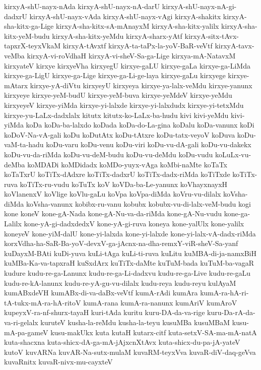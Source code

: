 {kirxyA-shU-nayx-nAda
kirxyA-shU-nayx-nA-darU
kirxyA-shU-nayx-nA-gi-dadxrU
kirxyA-shU-nayx-vAda
kirxyA-shU-nayx-vAgi
kirxyA-shakitx
kirxyA-sha-kitx-ga-Lige
kirxyA-sha-kitx-sA-mAnayxM
kirxyA-sha-kitx-yalilx
kirxyA-sha-kitx-yeM-budu
kirxyA-sha-kitx-yeMdu
kirxyA-sharx-yAtf
kirxyA-sitx-tAvx-tapxrX-teyxVkaM
kirxyA-tAvxtf
kirxyA-ta-taPx-la-yoV-BaR-veVtf
kirxyA-tavx-veMba
kirxyA-vi-roVdhaH
kirxyA-vi-sheV-Sa-ga-Lige
kirxya-mA-NatavxM
kirxyateV
kirxye
kirxyeVha
kirxyegU
kirxye-gaLU
kirxye-gaLa
kirxye-ga-LiMda
kirxye-ga-LigU
kirxye-ga-Lige
kirxye-ga-Li-ge-laya
kirxye-gaLu
kirxyege
kirxye-mAtarx
kirxye-yA-diVtu
kirxyeyU
kirxyeya
kirxye-ya-lalx-veMdu
kirxye-yanunx
kirxyeye
kirxye-yeM-budU
kirxye-yeM-buva
kirxye-yeMdeV
kirxye-yeMdu
kirxyeyeV
kirxye-yiMda
kirxye-yi-lalxde
kirxye-yi-lalxdudx
kirxye-yi-tetxMdu
kirxye-yu-LaLx-dadxlalx
kitutx
kitutx-ko-LaLx-ba-hudu
kivi
kivi-yeMdu
kivi-yiMda
koDa
koDa-ba-lalxdo
koDada
koDa-do-La-gina
koDalu
koDa-vanunx
koDi
koDoV-Na-vA-gali
koDu
koDutAtx
koDu-tAtxre
koDu-tatx-veyoV
koDuva
koDu-vaM-ta-hadu
koDu-varu
koDu-venu
koDu-viri
koDu-vu-dA-gali
koDu-vu-dakekx
koDu-vu-da-riMda
koDu-vu-deM-budu
koDu-vu-deMdu
koDu-vudu
koLuLx-vu-deMba
koMDADi
koMDidadx
koMDo-yuyx-vAga
koMbi-naMte
koTaTx
koTaTxrU
koTiTx-dAdxre
koTiTx-dadxrU
koTiTx-dadx-riMda
koTiTxde
koTiTx-ruva
koTiTx-ru-vudu
koTuTx
koV
koVDa-ba-Le-yanunx
koVhayxnayxH
koVlanenxV
koVlige
koVlu-gaLu
koVpa
koVpa-diMda
koVru-vu-dilalx
koVsha-diMda
koVsha-vanunx
kobibx-ru-vanu
kobubx
kobubx-vu-di-lalx-veM-budu
kogi
kone
koneV
kone-gA-Nada
kone-gA-Nu-va-da-riMda
kone-gA-Nu-vudu
kone-ga-Lalilx
kone-yA-gi-dadxdedxV
kone-yA-gi-ruva
koneya
kone-yalUlx
kone-yalilx
koneyeV
kone-yiM-dalU
kone-yi-lalxda
kone-yi-lalxde
kone-yi-lalx-vA-dadx-riMda
korxVdha-ha-SaR-Ba-yoV-devxV-ga-jAcnx-na-dha-remxY-viR-sheV-Sa-yanf
kuDayxM-BAti
kuDi-yuva
kuLi-tAga
kuLi-ti-ruva
kuLitu
kuMBA-di-ja-namxBiH
kuMBa-Ka-va-tapxraH
kuSxdArx
kuTiTx-daMte
kuTuM-bada
kuTuM-ba-vagaR
kudure
kudu-re-ga-Lanunx
kudu-re-ga-Li-dadxvu
kudu-re-ga-Live
kudu-re-gaLu
kudu-re-kA-lanunx
kudu-re-yA-gu-vu-dilalx
kudu-reya
kudu-reyu
kulAyaM
kumABxdeVH
kumABx-di-va-daBx-veVtf
kumA-rAdi
kumAra
kumA-ra-hA-ri-tA-tukx-mA-ra-hA-ritoV
kumA-rana
kumA-ra-nanunx
kumAriV
kumAroV
kupeyxV-ra-nf-shurx-tayaH
kuri-tAda
kuritu
kuru-DA-da-va-rige
kuru-Da-rA-da-va-ri-gelalx
kuruteV
kusha-la-reMdu
kusha-la-teyu
kusuMBa
kusuMBaM
kusu-mA-pa-gameV
kusu-makUkx
kuta
kutaH
kutarx-citf
kuta-setxV-SA-ma-mA-natA
kuta-shacxna
kuta-shicx-dA-ga-mA-jAjxcnXtAvx
kuta-shicx-du-pa-jA-yateV
kutoV
kuvARNa
kuvAR-Na-sutx-mulaM
kuvaRM-teyxVva
kuvaR-diV-daq-geVva
kuvaRnitx
kuvaR-nivx-mu-cayxteV
}
